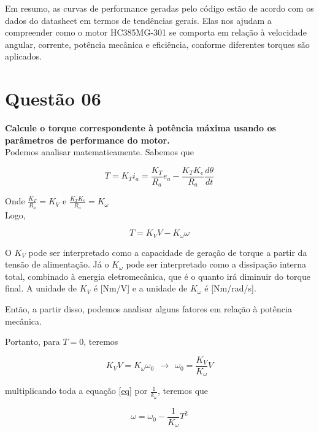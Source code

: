 \documentclass[a4paper, 12pt]{article}
\begin{document}
Em resumo, as curvas de performance geradas pelo código estão de acordo com os dados do datasheet em termos de tendências gerais. Elas nos ajudam a compreender como o motor HC385MG-301 se comporta em relação à velocidade angular, corrente, potência mecânica e eficiência, conforme diferentes torques são aplicados.


\newpage
\section{Questão 06}
\textbf{Calcule o torque correspondente à potência máxima usando os parâmetros de performance do motor.}\\

Podemos analisar matematicamente. Sabemos que

\begin{equation}
    T = K_T i_a = \frac{K_T}{R_a}e_a - \frac{K_TK_e}{R_a}\frac{d\theta}{dt}
\end{equation}

Onde $\frac{K_T}{R_a} = K_V$ e $\frac{K_TK_e}{R_a} = K_\omega$ \\ 

Logo, 

\begin{equation}\label{eq}
    T = K_VV - K_\omega \omega
\end{equation}

O $K_V$ pode ser interpretado como a capacidade de geração de torque a partir da tensão de alimentação. Já o $K_\omega$ pode ser interpretado como a dissipação interna total, combinado à energia eletromecânica, que é o quanto irá diminuir do torque final. A unidade de $K_V$ é [Nm/V] e a unidade de $K_\omega$ é [Nm/rad/s]. 

Então, a partir disso, podemos analisar alguns fatores em relação à potência mecânica. 

Portanto, para $T = 0$, teremos

\begin{equation}
    K_VV = K_\omega \omega_0 \>\ \longrightarrow \>\ \omega_0 = \frac{K_V}{K_\omega} V
\end{equation}

multiplicando toda a equação \ref{eq} por $\frac{1}{k_\omega}$, teremos que

\begin{equation}
    \omega = \omega_0 - \frac{1}{K_\omega} T^2
\end{equation}
\end{document}
